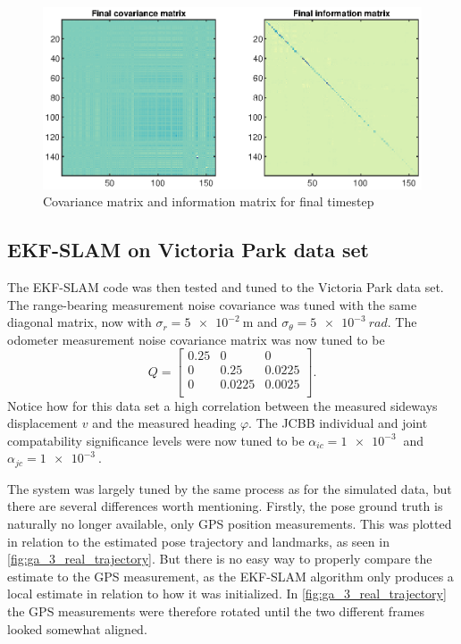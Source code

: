 \begin{figure}[!htb]
    \centering
    \includegraphics[width=0.7\linewidth]{figures/ga_3/sim_P.eps}
    \caption{Covariance matrix and information matrix for final timestep}
    \label{fig:ga_3_sim_P}
\end{figure}


\subsection{EKF-SLAM on Victoria Park data set}

The EKF-SLAM code was then tested and tuned to the Victoria Park data set. The range-bearing measurement noise covariance was tuned with the same diagonal matrix, now with $\sigma_r = \SI{5e-2}{\meter}$ and $\sigma_\theta = \SI{5e-3}{rad}$. The odometer measurement noise covariance matrix was now tuned to be
\begin{equation}
    Q = \begin{bmatrix}
        0.25 & 0 & 0 \\
        0 & 0.25 & 0.0225 \\
        0 & 0.0225 & 0.0025 \\
    \end{bmatrix}.
\end{equation}
Notice how for this data set a high correlation between the measured sideways displacement $v$ and the measured heading $\varphi$. The JCBB individual and joint compatability significance levels were now tuned to be $\alpha_{ic} = \SI{1e-3}{}$ and $\alpha_{jc} = \SI{1e-3}{}$.

The system was largely tuned by the same process as for the simulated data, but there are several differences worth mentioning. Firstly, the pose ground truth is naturally no longer available, only GPS position measurements. This was plotted in relation to the estimated pose trajectory and landmarks, as seen in \cref{fig:ga_3_real_trajectory}. But there is no easy way to properly compare the estimate to the GPS measurement, as the EKF-SLAM algorithm only produces a local estimate in relation to how it was initialized. In \cref{fig:ga_3_real_trajectory} the GPS measurements were therefore rotated until the two different frames looked somewhat aligned.

